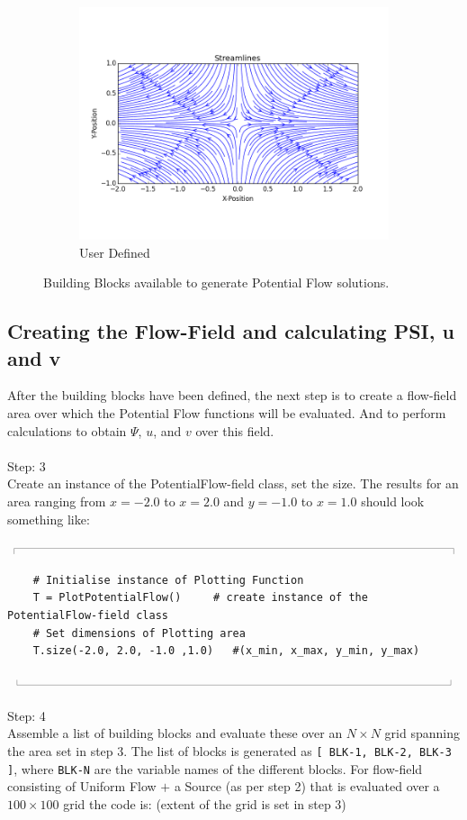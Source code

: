 \documentclass[10pt,a4paper]{article}
\newcommand{\topbar}{\ensuremath{
    \rule{0.1mm}{2.0mm} \rule[2.0mm]{159.5mm}{0.1mm} \rule{0.1mm}{2.0mm}
}}
\newcommand{\bottombar}{\ensuremath{
    \rule{0.1mm}{2.0mm} \rule{159.5mm}{0.1mm} \rule{0.1mm}{2.0mm}
}}
\begin{document}
\begin{figure}
\begin{subfigure}{0.32\textwidth}
    \includegraphics[width=1.0\textwidth]{Figures/User_Defined}
  \caption{User Defined}\label{F_User}
\end{subfigure}
\hfill
\caption{Building Blocks available to generate Potential Flow solutions.}
\label{F_Blocks}
\end{figure}


\subsection{Creating the Flow-Field and calculating PSI, u and v}

After the building blocks have been defined, the next step is to create a flow-field area over which the Potential Flow functions will be evaluated. 
And to perform calculations to obtain $\Psi$, $u$, and $v$ over this field.
\\ \\
\noindent
{\huge Step: 3}\\
Create an instance of the PotentialFlow-field class, set the size. 
The results for an area ranging from $x = \num{-2.0}$ to $x=\num{2.0}$ and $y = \num{-1.0}$ to $x=\num{1.0}$ should look something like:

\noindent
\topbar
\begin{lstlisting}
    # Initialise instance of Plotting Function
    T = PlotPotentialFlow()   	# create instance of the PotentialFlow-field class
    # Set dimensions of Plotting area
    T.size(-2.0, 2.0, -1.0 ,1.0)   #(x_min, x_max, y_min, y_max)
\end{lstlisting}
\bottombar
\\ \\
\noindent
{\huge Step: 4}\\
Assemble a list of building blocks and evaluate these over an $N \times N$ grid spanning the area set in step 3. 
The list of blocks is generated as \verb'[ BLK-1, BLK-2, BLK-3 ]', where \verb'BLK-N' are the variable names of the different blocks. 
For flow-field consisting of Uniform Flow $+$ a Source (as per step 2) that is evaluated over a $100 \times 100$ grid the code is: (extent of the grid is set in step 3)
\end{document}
